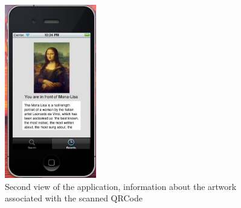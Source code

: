 \documentclass[a4paper, 12pt, final]{article}
\begin{document}
\begin{figure}[!h] %
\centering
\includegraphics[width=4cm]{2.jpg} %
\caption{Second view of the application, information about the artwork associated with the scanned QRCode} %
\label{api} %
\end{figure} %
 
 
\end{document}
